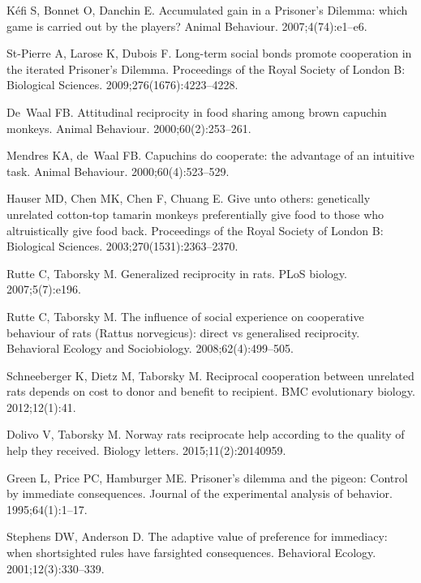 \documentclass[10pt,letterpaper]{article}
\begin{document}
\begin{thebibliography}{10}
K{\'e}fi S, Bonnet O, Danchin E.
\newblock Accumulated gain in a Prisoner's Dilemma: which game is carried out
  by the players?
\newblock Animal Behaviour. 2007;4(74):e1--e6.

St-Pierre A, Larose K, Dubois F.
\newblock Long-term social bonds promote cooperation in the iterated Prisoner's
  Dilemma.
\newblock Proceedings of the Royal Society of London B: Biological Sciences.
  2009;276(1676):4223--4228.

De~Waal FB.
\newblock Attitudinal reciprocity in food sharing among brown capuchin monkeys.
\newblock Animal Behaviour. 2000;60(2):253--261.

Mendres KA, de~Waal FB.
\newblock Capuchins do cooperate: the advantage of an intuitive task.
\newblock Animal Behaviour. 2000;60(4):523--529.

Hauser MD, Chen MK, Chen F, Chuang E.
\newblock Give unto others: genetically unrelated cotton-top tamarin monkeys
  preferentially give food to those who altruistically give food back.
\newblock Proceedings of the Royal Society of London B: Biological Sciences.
  2003;270(1531):2363--2370.

Rutte C, Taborsky M.
\newblock Generalized reciprocity in rats.
\newblock PLoS biology. 2007;5(7):e196.

Rutte C, Taborsky M.
\newblock The influence of social experience on cooperative behaviour of rats
  (Rattus norvegicus): direct vs generalised reciprocity.
\newblock Behavioral Ecology and Sociobiology. 2008;62(4):499--505.

Schneeberger K, Dietz M, Taborsky M.
\newblock Reciprocal cooperation between unrelated rats depends on cost to
  donor and benefit to recipient.
\newblock BMC evolutionary biology. 2012;12(1):41.

Dolivo V, Taborsky M.
\newblock Norway rats reciprocate help according to the quality of help they
  received.
\newblock Biology letters. 2015;11(2):20140959.

Green L, Price PC, Hamburger ME.
\newblock Prisoner's dilemma and the pigeon: Control by immediate consequences.
\newblock Journal of the experimental analysis of behavior. 1995;64(1):1--17.

Stephens DW, Anderson D.
\newblock The adaptive value of preference for immediacy: when shortsighted
  rules have farsighted consequences.
\newblock Behavioral Ecology. 2001;12(3):330--339.


\end{thebibliography}
\end{document}
